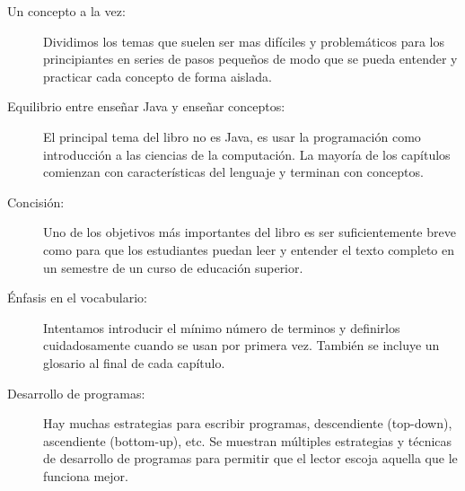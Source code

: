 \begin{description}

\item[Un concepto a la vez:]
Dividimos los temas que suelen ser mas difíciles y problemáticos para los principiantes en series de pasos pequeños de modo que se pueda entender y practicar cada concepto de forma aislada.

\item[Equilibrio entre enseñar Java y enseñar conceptos:]
El principal tema del libro no es Java, es usar la programación como introducción a las ciencias de la computación.
La mayoría de los capítulos comienzan con características del lenguaje y terminan con conceptos.

\item[Concisión:]
Uno de los objetivos más importantes del libro es ser suficientemente breve como para que los estudiantes puedan leer y entender el texto completo en un semestre de un curso de educación superior.

\item[Énfasis en el vocabulario:]
Intentamos introducir el mínimo número de terminos y definirlos cuidadosamente cuando se usan por primera vez.
También se incluye un glosario al final de cada capítulo.

\item[Desarrollo de programas:]
Hay muchas estrategias para escribir programas, descendiente (top-down), ascendiente (bottom-up), etc.
Se muestran múltiples estrategias y técnicas de desarrollo de programas para permitir que el lector escoja aquella que le funciona mejor.


\end{description}
